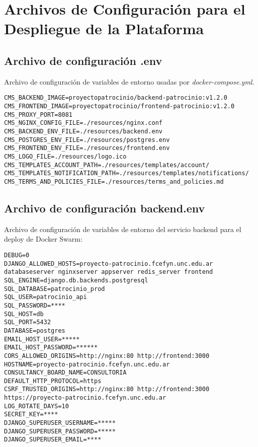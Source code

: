 \chapter{Archivos de Configuración para el Despliegue de la Plataforma}\label{cap:apendix-configfile-deloy}

\section{Archivo de configuración \textbf{.env}}\label{sec:anexo:configfile-env}
Archivo de configuración de variables de entorno usadas por \textit{docker-compose.yml}.
\begin{lstlisting}[caption={Archivo de configuración .env}, label={cod:.env}, captionpos=b]
CMS_BACKEND_IMAGE=proyectopatrocinio/backend-patrocinio:v1.2.0
CMS_FRONTEND_IMAGE=proyectopatrocinio/frontend-patrocinio:v1.2.0
CMS_PROXY_PORT=8081
CMS_NGINX_CONFIG_FILE=./resources/nginx.conf
CMS_BACKEND_ENV_FILE=./resources/backend.env
CMS_POSTGRES_ENV_FILE=./resources/postgres.env
CMS_FRONTEND_ENV_FILE=./resources/frontend.env
CMS_LOGO_FILE=./resources/logo.ico
CMS_TEMPLATES_ACCOUNT_PATH=./resources/templates/account/
CMS_TEMPLATES_NOTIFICATION_PATH=./resources/templates/notifications/
CMS_TERMS_AND_POLICIES_FILE=./resources/terms_and_policies.md
\end{lstlisting}



\section{Archivo de configuración \textbf{backend.env}}\label{sec:anexo:configfile-backend-env}
Archivo de configuración de variables de entorno del servicio backend para el deploy de Docker Swarm:

\begin{lstlisting}[caption={Archivo de configuración backend.env}, label={cod:backend.env}, captionpos=b]
DEBUG=0
DJANGO_ALLOWED_HOSTS=proyecto-patrocinio.fcefyn.unc.edu.ar databaseserver nginxserver appserver redis_server frontend
SQL_ENGINE=django.db.backends.postgresql
SQL_DATABASE=patrocinio_prod
SQL_USER=patrocinio_api
SQL_PASSWORD=****
SQL_HOST=db
SQL_PORT=5432
DATABASE=postgres
EMAIL_HOST_USER=*****
EMAIL_HOST_PASSWORD=******
CORS_ALLOWED_ORIGINS=http://nginx:80 http://frontend:3000
HOSTNAME=proyecto-patrocinio.fcefyn.unc.edu.ar
CONSULTANCY_BOARD_NAME=CONSULTORIA
DEFAULT_HTTP_PROTOCOL=https
CSRF_TRUSTED_ORIGINS=http://nginx:80 http://frontend:3000 https://proyecto-patrocinio.fcefyn.unc.edu.ar
LOG_ROTATE_DAYS=10
SECRET_KEY=****
DJANGO_SUPERUSER_USERNAME=*****
DJANGO_SUPERUSER_PASSWORD=*****
DJANGO_SUPERUSER_EMAIL=****
\end{lstlisting}


